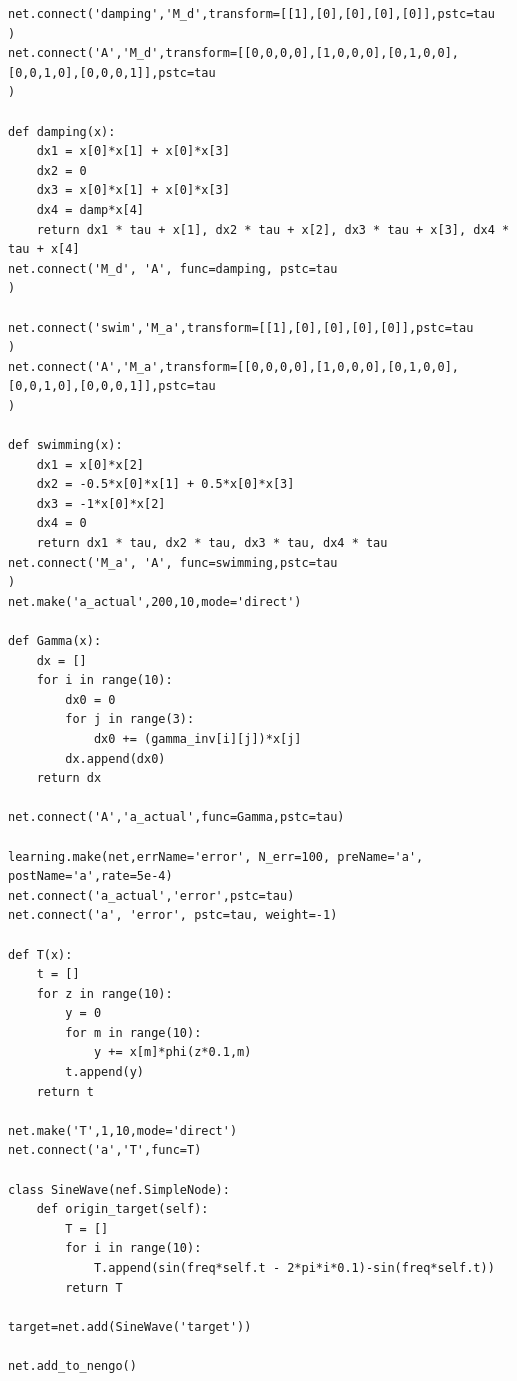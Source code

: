 \documentclass[12pt]{article}
\begin{document}
\begin{verbatim}
net.connect('damping','M_d',transform=[[1],[0],[0],[0],[0]],pstc=tau
)
net.connect('A','M_d',transform=[[0,0,0,0],[1,0,0,0],[0,1,0,0],[0,0,1,0],[0,0,0,1]],pstc=tau
)

def damping(x):
    dx1 = x[0]*x[1] + x[0]*x[3]
    dx2 = 0
    dx3 = x[0]*x[1] + x[0]*x[3]
    dx4 = damp*x[4]
    return dx1 * tau + x[1], dx2 * tau + x[2], dx3 * tau + x[3], dx4 * tau + x[4]
net.connect('M_d', 'A', func=damping, pstc=tau
)

net.connect('swim','M_a',transform=[[1],[0],[0],[0],[0]],pstc=tau
)
net.connect('A','M_a',transform=[[0,0,0,0],[1,0,0,0],[0,1,0,0],[0,0,1,0],[0,0,0,1]],pstc=tau
)

def swimming(x):
    dx1 = x[0]*x[2]
    dx2 = -0.5*x[0]*x[1] + 0.5*x[0]*x[3]
    dx3 = -1*x[0]*x[2]
    dx4 = 0
    return dx1 * tau, dx2 * tau, dx3 * tau, dx4 * tau
net.connect('M_a', 'A', func=swimming,pstc=tau
)
net.make('a_actual',200,10,mode='direct')

def Gamma(x):
    dx = []
    for i in range(10):
        dx0 = 0
        for j in range(3):
            dx0 += (gamma_inv[i][j])*x[j]
        dx.append(dx0)
    return dx

net.connect('A','a_actual',func=Gamma,pstc=tau)

learning.make(net,errName='error', N_err=100, preName='a', postName='a',rate=5e-4)
net.connect('a_actual','error',pstc=tau)
net.connect('a', 'error', pstc=tau, weight=-1)

def T(x):
    t = []
    for z in range(10):
        y = 0
        for m in range(10):
            y += x[m]*phi(z*0.1,m)
        t.append(y)
    return t

net.make('T',1,10,mode='direct')
net.connect('a','T',func=T)

class SineWave(nef.SimpleNode):
    def origin_target(self):
        T = []
        for i in range(10):
            T.append(sin(freq*self.t - 2*pi*i*0.1)-sin(freq*self.t))
        return T

target=net.add(SineWave('target'))

net.add_to_nengo()
\end{verbatim}
\end{document}
